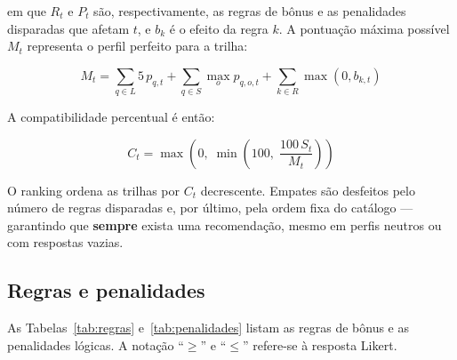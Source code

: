 \documentclass[12pt,a4paper]{article}
\begin{document}
em que $R_t$ e $P_t$ s\~ao, respectivamente, as regras de b\^onus e as penalidades
disparadas que afetam $t$, e $b_k$ \'e o efeito da regra $k$. A pontua\c{c}\~ao
m\'axima poss\'ivel $M_t$ representa o perfil perfeito para a trilha:

\begin{equation}
M_t = \sum_{q \in L} 5\, p_{q,t}
    + \sum_{q \in S} \max_{o} p_{q,o,t}
    + \sum_{k \in R} \max(0, b_{k,t})
\end{equation}

A compatibilidade percentual \'e ent\~ao:

\begin{equation}
C_t = \max\!\left(0,\; \min\!\left(100,\; \frac{100\, S_t}{M_t}\right)\right)
\end{equation}

O ranking ordena as trilhas por $C_t$ decrescente. Empates s\~ao desfeitos pelo
n\'umero de regras disparadas e, por \'ultimo, pela ordem fixa do cat\'alogo ---
garantindo que \textbf{sempre} exista uma recomenda\c{c}\~ao, mesmo em perfis
neutros ou com respostas vazias.

\subsection{Regras e penalidades}

As Tabelas~\ref{tab:regras} e~\ref{tab:penalidades} listam as regras de b\^onus e
as penalidades l\'ogicas. A nota\c{c}\~ao ``$\geq$'' e ``$\leq$'' refere-se \`a resposta
Likert.
\end{document}
